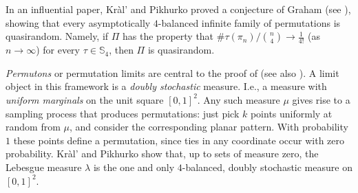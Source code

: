 \documentclass{article}
\newcommand{\pc}[2]{{\# \mathtt{ #1 } \left( #2 \right)}}
\theoremstyle{remark}
\theoremstyle{plain}
\begin{document}
In an influential paper, \cite{kral2013quasirandom} Kr\`al' and Pikhurko proved a conjecture of Graham (see \cite{cooper2004quasirandom}), showing that every asymptotically $4$-balanced infinite family of permutations is quasirandom. Namely, if $\Pi$ has the property that $\pc{\tau}{\pi_n}/\binom{n}{4} \to \tfrac{1}{4!}$ (as $n \to \infty$) for every $\tau \in \mathbb{S}_4$, then $\Pi$ is quasirandom. 

{\em Permutons} or permutation limits are central to
the proof of \cite{kral2013quasirandom} (see also \cite{hoppen2013limits, hoppen2011limits}). A limit object in this framework is a {\em doubly stochastic} measure. I.e., a measure with \emph{uniform marginals} on the unit square $[0,1]^2$. Any such measure $\mu$ gives rise to a sampling process that produces permutations: just pick $k$ points uniformly at random from $\mu$, and consider the corresponding planar pattern. With probability $1$ these points define a permutation, since ties in any coordinate occur with zero probability. Kr\`al' and Pikhurko show that, up to sets of measure zero, the Lebesgue measure $\lambda$ is the one and only $4$-balanced, doubly stochastic measure on $[0,1]^2$.
\end{document}
